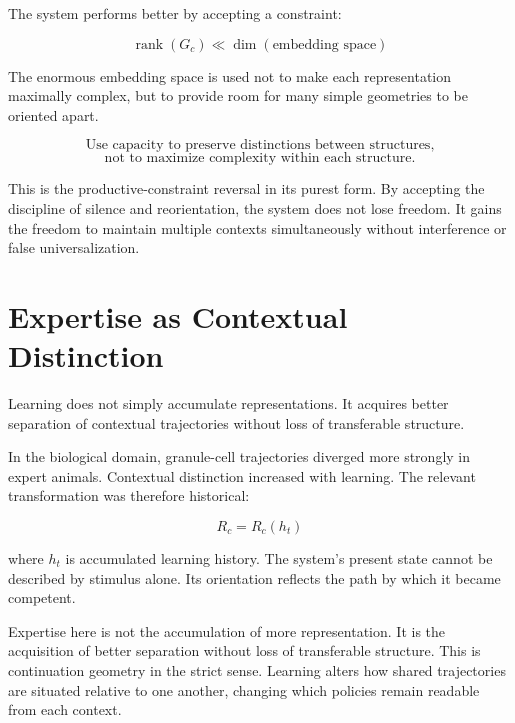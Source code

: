\documentclass[12pt]{article}
\begin{document}
The system performs better by accepting a constraint:

\begin{equation}
\operatorname{rank}(G_c) \ll \operatorname{dim}(\text{embedding space})
\end{equation}

The enormous embedding space is used not to make each representation maximally complex, but to provide room for many simple geometries to be oriented apart.

\begin{equation}
\boxed{\text{Use capacity to preserve distinctions between structures,}}
\end{equation}
\begin{equation}
\boxed{\text{not to maximize complexity within each structure.}}
\end{equation}

This is the productive-constraint reversal in its purest form. By accepting the discipline of silence and reorientation, the system does not lose freedom. It gains the freedom to maintain multiple contexts simultaneously without interference or false universalization.

\section{Expertise as Contextual Distinction}

Learning does not simply accumulate representations. It acquires better separation of contextual trajectories without loss of transferable structure.

In the biological domain, granule-cell trajectories diverged more strongly in expert animals. Contextual distinction increased with learning. The relevant transformation was therefore historical:

\begin{equation}
R_c = R_c(h_t)
\end{equation}

where $h_t$ is accumulated learning history. The system's present state cannot be described by stimulus alone. Its orientation reflects the path by which it became competent.

Expertise here is not the accumulation of more representation. It is the acquisition of better separation without loss of transferable structure. This is continuation geometry in the strict sense. Learning alters how shared trajectories are situated relative to one another, changing which policies remain readable from each context.
\end{document}
